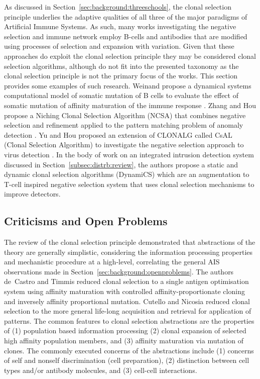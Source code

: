 As discussed in Section~\ref{sec:background:threeschools}, the clonal selection principle underlies the adaptive qualities of all three of the major paradigms of Artificial Immune Systems. As such, many works investigating the negative selection and immune network employ B-cells and antibodies that are modified using processes of selection and expansion with variation. Given that these approaches do exploit the clonal selection principle they may be considered clonal selection algorithms, although do not fit into the presented taxonomy as the clonal selection principle is not the primary focus of the works. This section provides some examples of such research. Weinand propose a dynamical systems computational model of somatic mutation of B cells to evaluate the effect of somatic mutation of affinity maturation of the immune response \cite{Weinand1990}. Zhang and Hou propose a Niching Clonal Selection Algorithm (NCSA) that combines negative selection and refinement applied to the pattern matching problem of anomaly detection \cite{Zhang2003}. Yu and Hou proposed an extension of CLONALG called CsAL (Clonal Selection Algorithm) to investigate the negative selection approach to virus detection \cite{Yu2004}. In the body of work on an integrated intrusion detection system discussed in Section~\ref{subsec:distrb:review}, the authors propose a static and dynamic clonal selection algorithms (DynamiCS) which are an augmentation to T-cell inspired negative selection system that uses clonal selection mechanisms to improve detectors. 

%
%
\subsection{Criticisms and Open Problems}
\label{subsec:cs:algorithms:problems}
The review of the clonal selection principle demonstrated that abstractions of the theory are generally simplistic, considering the information processing properties and mechanistic procedure at a high-level, correlating the general AIS observations made in Section~\ref{sec:background:openproblems}. 
The authors de~Castro and Timmis reduced clonal selection to a single antigen optimisation system using affinity maturation with controlled affinity-proportionate cloning and inversely affinity proportional mutation. Cutello and Nicosia reduced clonal selection to the more general life-long acquisition and retrieval for application of patterns. The common features to clonal selection abstractions are the properties of (1) population based information processing (2) clonal expansion of selected high affinity population members, and (3) affinity maturation via mutation of clones. The commonly executed concerns of the abstractions include (1) concerns of self and nonself discrimination (cell preparation), (2) distinction between cell types and/or antibody molecules, and (3) cell-cell interactions.


